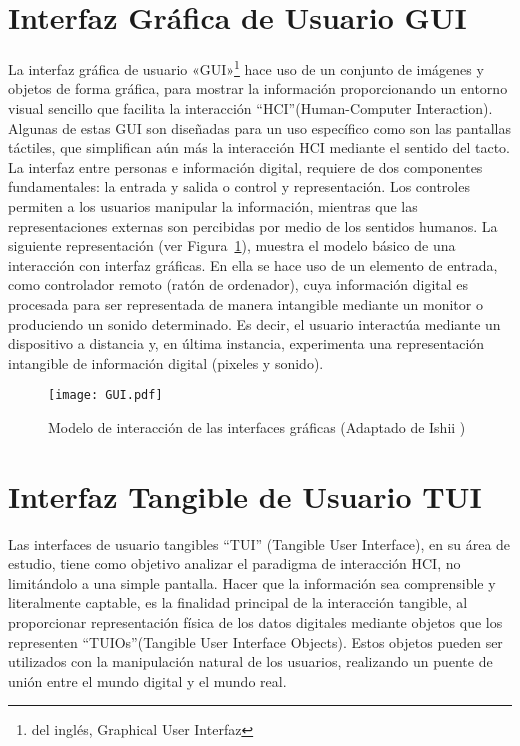 \section{Interfaz Gráfica de Usuario GUI}
La interfaz gráfica de usuario «GUI»\footnote{del inglés, Graphical User Interfaz} hace uso de un conjunto de imágenes y objetos de forma gráfica, para mostrar la información proporcionando un entorno visual sencillo que facilita la interacción “HCI”(Human-Computer Interaction). Algunas de estas GUI son diseñadas para un uso específico como son las pantallas táctiles, que simplifican aún más la interacción HCI mediante el sentido del tacto.
La interfaz entre personas e información digital, requiere de dos componentes fundamentales: la entrada y salida o control y representación. Los controles permiten a los usuarios manipular la información, mientras que las representaciones externas son percibidas por medio de los sentidos humanos. La siguiente representación (ver Figura~\ref{fig:GUI}), muestra el modelo básico de una interacción con interfaz gráficas. En ella se hace uso de un elemento de entrada, como controlador remoto (ratón de ordenador), cuya información digital es procesada para ser representada de manera intangible mediante un monitor o produciendo un sonido determinado. Es decir, el usuario interactúa mediante un dispositivo a distancia y, en última instancia, experimenta una representación intangible de información digital (pixeles y sonido).

\begin{figure}[!h]
\begin{center}
\texttt{[image: GUI.pdf]}
\caption{Modelo de interacción de las interfaces gráficas (Adaptado de Ishii \cite{Ishii})}
\label{fig:GUI}
\end{center}
\end{figure}

\section{Interfaz Tangible de Usuario TUI}
Las interfaces de usuario tangibles “TUI” (Tangible User Interface), en su área de estudio, tiene como objetivo analizar el paradigma de interacción HCI, no limitándolo a una simple pantalla. Hacer que la información sea comprensible y literalmente captable, es la finalidad principal de la interacción tangible, al proporcionar representación física de los datos digitales mediante objetos que los representen “TUIOs”(Tangible User Interface Objects). Estos objetos pueden ser utilizados con la manipulación natural de los usuarios, realizando un puente de unión entre el mundo digital y el mundo real.

